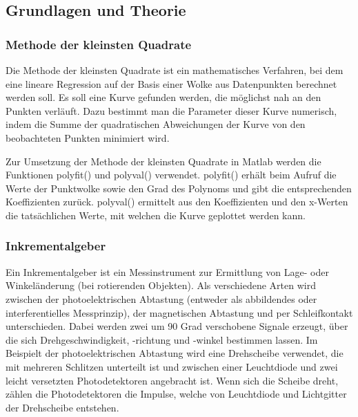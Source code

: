 \subsection{Grundlagen und Theorie}

\subsubsection{Methode der kleinsten Quadrate}
Die Methode der kleinsten Quadrate ist ein mathematisches Verfahren, bei dem eine lineare Regression
auf der Basis einer Wolke aus Datenpunkten berechnet werden soll. Es soll eine Kurve gefunden werden,
die möglichst nah an den Punkten verläuft. Dazu bestimmt man die Parameter dieser Kurve numerisch, indem die Summe 
der quadratischen Abweichungen der Kurve von den beobachteten Punkten minimiert wird.

Zur Umsetzung der Methode der kleinsten Quadrate in Matlab werden die Funktionen polyfit() und polyval() verwendet. 
polyfit() erhält beim Aufruf die Werte der Punktwolke sowie den Grad des Polynoms und gibt die entsprechenden Koeffizienten
zurück. polyval() ermittelt aus den Koeffizienten und den x-Werten die tatsächlichen Werte, mit welchen die Kurve geplottet 
werden kann. 

\subsubsection{Inkrementalgeber}
Ein Inkrementalgeber ist ein Messinstrument zur Ermittlung von Lage- oder Winkeländerung (bei rotierenden Objekten). 
Als verschiedene Arten wird zwischen der photoelektrischen Abtastung (entweder als abbildendes oder interferentielles
Messprinzip), der magnetischen Abtastung und per Schleifkontakt unterschieden. Dabei werden zwei um 90 Grad verschobene
Signale erzeugt, über die sich Drehgeschwindigkeit, -richtung und -winkel bestimmen lassen.
Im Beispielt der photoelektrischen Abtastung wird eine Drehscheibe verwendet, die mit mehreren Schlitzen unterteilt ist und 
zwischen einer Leuchtdiode und zwei leicht versetzten Photodetektoren angebracht ist. Wenn sich die Scheibe dreht, zählen
die Photodetektoren die Impulse, welche von Leuchtdiode und Lichtgitter der Drehscheibe entstehen.  